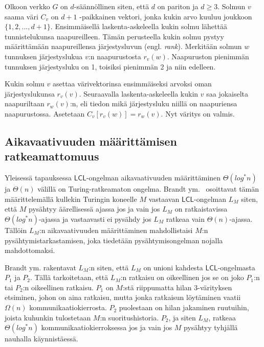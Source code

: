 \documentclass[12pt,finnish]{tktltiki2}
\theoremstyle{definition}
\theoremstyle{remark}
\newcommand*{\lcl}{\ensuremath{\mathsf{LCL}}}
\begin{document}
Olkoon verkko $G$ on $d$-säännöllinen siten, että $d$ on pariton ja $d \geq 3$. Solmun $v$ saama väri $C_v$ on $d+1$ -paikkainen vektori, jonka kukin arvo kuuluu joukkoon $\{1, 2, ..., d+1\}$. Ensimmäisellä laskenta-askeleella kukin solmu lähettää tunnistelukunsa naapureilleen. Tämän perusteella kukin solmu pystyy määrittämään naapureillensa järjestysluvun (engl. \textit{rank}). Merkitään solmun $w$ tunnuksen järjestyslukua $v$:n naapurustosta $r_v(w)$. Naapuruston pienimmän tunnuksen järjestysluku on 1, toisiksi pienimmän 2 ja niin edelleen.

Kukin solmu $v$ asettaa värivektorinsa ensimmäiseksi arvoksi oman järjestyslukunsa $r_v(v)$. Seuraavalla laskenta-askeleella kukin $v$ saa jokaiselta naapuriltaan $r_w(v)$:n, eli tiedon mikä järjestysluku niillä on naapuriensa naapurustossa. Asetetaan $C_v[r_v(w)] = r_w(v)$. Nyt väritys on valmis.
\fi



\subsection{Aikavaativuuden määrittämisen ratkeamattomuus}
Yleisessä tapauksessa \lcl -ongelman aikavaativuuden määrittäminen $\Theta(log^* n)$ ja $\Theta(n)$ välillä on Turing-ratkeamaton ongelma. Brandt ym.~\cite{brandt} osoittavat tämän määrittelemällä kullekin Turingin koneelle $M$ vastaavan \lcl -ongelman $L_M$ siten, että $M$ pysähtyy äärellisessä ajassa jos ja vain jos $L_M$ on ratkaistavissa $\Theta(log^* n)$-ajassa ja vastaavasti ei pysähdy jos $L_M$ ratkeaa vain $\Theta(n)$-ajassa. Tällöin $L_M$:n aikavaativuuden määrittäminen mahdollistaisi $M$:n pysähtymistarkastamisen, joka tiedetään pysähtymisongelman nojalla mahdottomaksi.


Brandt ym. rakentavat $L_M$:n siten, että $L_M$ on unioni kahdesta \lcl -ongelmasta $P_1$ ja $P_2$. Tällä tarkoitetaan, että $L_M$:n ratkaisu on oikeellinen jos se on joko $P_1$:n tai $P_2$:n oikeellinen ratkaisu. $P_1$ on $M$:stä riippumatta hilan 3-värityksen etsiminen, johon on aina ratkaisu, mutta jonka ratkaisun löytäminen vaatii $\Omega(n)$ kommunikaatiokierrosta. $P_2$ puolestaan on hilan jakaminen ruutuihin, joista kuhunkin tulostetaan $M$:n suoritushistoria. $P_2$, ja siten $L_M$, ratkeaa $\Theta(log^* n)$ kommunikaatiokierroksessa jos ja vain jos $M$ pysähtyy tyhjällä nauhalla käynnistäessä.
\end{document}
